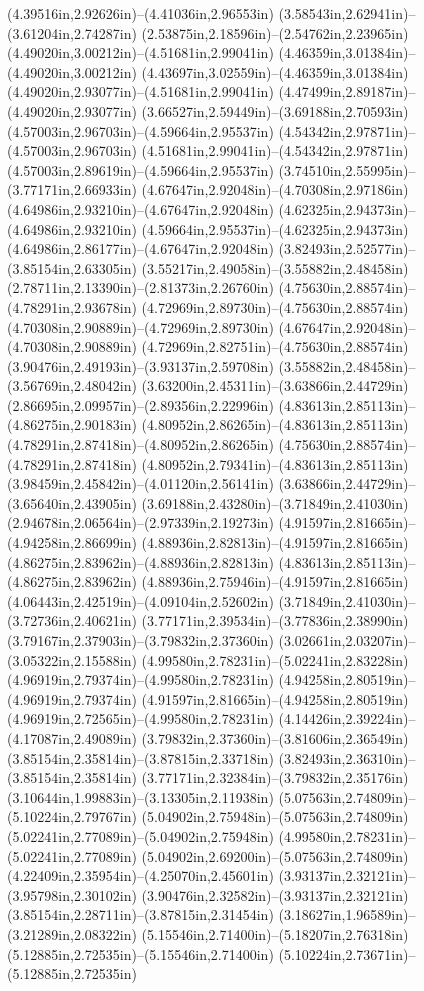 (4.39516in,2.92626in)--(4.41036in,2.96553in) (3.58543in,2.62941in)--(3.61204in,2.74287in) (2.53875in,2.18596in)--(2.54762in,2.23965in) (4.49020in,3.00212in)--(4.51681in,2.99041in) (4.46359in,3.01384in)--(4.49020in,3.00212in) (4.43697in,3.02559in)--(4.46359in,3.01384in) (4.49020in,2.93077in)--(4.51681in,2.99041in) (4.47499in,2.89187in)--(4.49020in,2.93077in) (3.66527in,2.59449in)--(3.69188in,2.70593in) (4.57003in,2.96703in)--(4.59664in,2.95537in) (4.54342in,2.97871in)--(4.57003in,2.96703in) (4.51681in,2.99041in)--(4.54342in,2.97871in) (4.57003in,2.89619in)--(4.59664in,2.95537in) (3.74510in,2.55995in)--(3.77171in,2.66933in) (4.67647in,2.92048in)--(4.70308in,2.97186in) (4.64986in,2.93210in)--(4.67647in,2.92048in) (4.62325in,2.94373in)--(4.64986in,2.93210in) (4.59664in,2.95537in)--(4.62325in,2.94373in) (4.64986in,2.86177in)--(4.67647in,2.92048in) (3.82493in,2.52577in)--(3.85154in,2.63305in) (3.55217in,2.49058in)--(3.55882in,2.48458in) (2.78711in,2.13390in)--(2.81373in,2.26760in) (4.75630in,2.88574in)--(4.78291in,2.93678in) (4.72969in,2.89730in)--(4.75630in,2.88574in) (4.70308in,2.90889in)--(4.72969in,2.89730in) (4.67647in,2.92048in)--(4.70308in,2.90889in) (4.72969in,2.82751in)--(4.75630in,2.88574in) (3.90476in,2.49193in)--(3.93137in,2.59708in) (3.55882in,2.48458in)--(3.56769in,2.48042in) (3.63200in,2.45311in)--(3.63866in,2.44729in) (2.86695in,2.09957in)--(2.89356in,2.22996in) (4.83613in,2.85113in)--(4.86275in,2.90183in) (4.80952in,2.86265in)--(4.83613in,2.85113in) (4.78291in,2.87418in)--(4.80952in,2.86265in) (4.75630in,2.88574in)--(4.78291in,2.87418in) (4.80952in,2.79341in)--(4.83613in,2.85113in) (3.98459in,2.45842in)--(4.01120in,2.56141in) (3.63866in,2.44729in)--(3.65640in,2.43905in) (3.69188in,2.43280in)--(3.71849in,2.41030in) (2.94678in,2.06564in)--(2.97339in,2.19273in) (4.91597in,2.81665in)--(4.94258in,2.86699in) (4.88936in,2.82813in)--(4.91597in,2.81665in) (4.86275in,2.83962in)--(4.88936in,2.82813in) (4.83613in,2.85113in)--(4.86275in,2.83962in) (4.88936in,2.75946in)--(4.91597in,2.81665in) (4.06443in,2.42519in)--(4.09104in,2.52602in) (3.71849in,2.41030in)--(3.72736in,2.40621in) (3.77171in,2.39534in)--(3.77836in,2.38990in) (3.79167in,2.37903in)--(3.79832in,2.37360in) (3.02661in,2.03207in)--(3.05322in,2.15588in) (4.99580in,2.78231in)--(5.02241in,2.83228in) (4.96919in,2.79374in)--(4.99580in,2.78231in) (4.94258in,2.80519in)--(4.96919in,2.79374in) (4.91597in,2.81665in)--(4.94258in,2.80519in) (4.96919in,2.72565in)--(4.99580in,2.78231in) (4.14426in,2.39224in)--(4.17087in,2.49089in) (3.79832in,2.37360in)--(3.81606in,2.36549in) (3.85154in,2.35814in)--(3.87815in,2.33718in) (3.82493in,2.36310in)--(3.85154in,2.35814in) (3.77171in,2.32384in)--(3.79832in,2.35176in) (3.10644in,1.99883in)--(3.13305in,2.11938in) (5.07563in,2.74809in)--(5.10224in,2.79767in) (5.04902in,2.75948in)--(5.07563in,2.74809in) (5.02241in,2.77089in)--(5.04902in,2.75948in) (4.99580in,2.78231in)--(5.02241in,2.77089in) (5.04902in,2.69200in)--(5.07563in,2.74809in) (4.22409in,2.35954in)--(4.25070in,2.45601in) (3.93137in,2.32121in)--(3.95798in,2.30102in) (3.90476in,2.32582in)--(3.93137in,2.32121in) (3.85154in,2.28711in)--(3.87815in,2.31454in) (3.18627in,1.96589in)--(3.21289in,2.08322in) (5.15546in,2.71400in)--(5.18207in,2.76318in) (5.12885in,2.72535in)--(5.15546in,2.71400in) (5.10224in,2.73671in)--(5.12885in,2.72535in) 